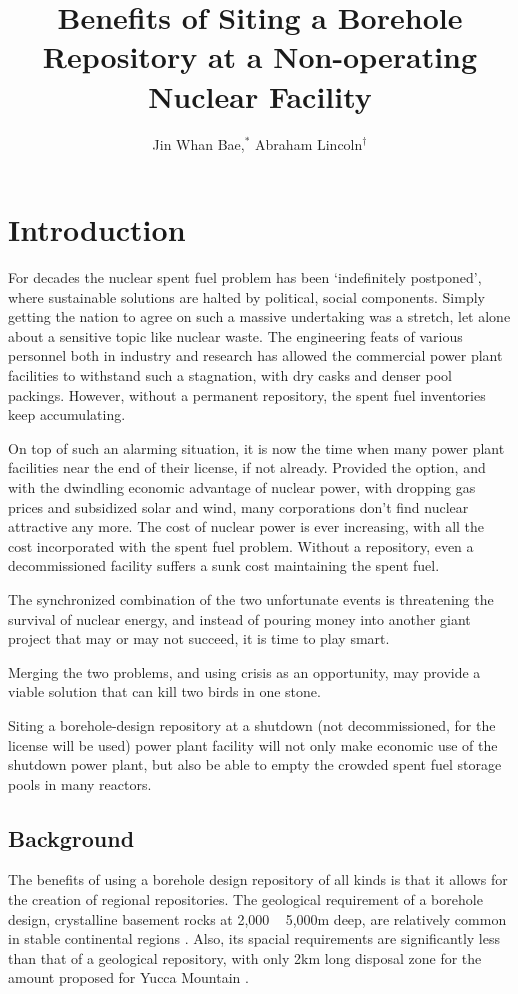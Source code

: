 \documentclass{anstrans}
\title{Benefits of Siting a Borehole Repository at a Non-operating Nuclear 
Facility}
\author{Jin Whan Bae,$^{*}$ Abraham Lincoln$^{\dagger}$}
\institute{
$^{*}$Dept. of Nuclear Plasma, and Radiological Engineering, University of Illinois at Urbana-Champaign, Urbana, IL
\and
$^{\dagger}$State Capitol Building, Springfield, IL
}
\begin{document}
\section{Introduction}

For decades the nuclear spent fuel problem has been `indefinitely postponed', 
where sustainable solutions are halted by political, social components. Simply 
getting the nation to agree on such a massive undertaking was a stretch, let 
alone about a sensitive topic like nuclear waste. The engineering feats of 
various personnel both in industry and research has allowed the commercial 
power plant facilities to withstand such a stagnation, with dry casks and 
denser pool packings. However, without a permanent repository, the spent fuel 
inventories keep accumulating.

On top of such an alarming situation, it is now the time when many power plant 
facilities near the end of their license, if not already. Provided the option, 
and with the dwindling economic advantage of nuclear power, with dropping gas 
prices and subsidized solar and wind, many corporations don't find nuclear 
attractive any more. The cost of nuclear power is ever increasing, with all the 
cost incorporated with the spent fuel problem. Without a repository, even a 
decommissioned facility suffers a sunk cost maintaining the spent fuel.

The synchronized combination of the two unfortunate events is threatening the 
survival of nuclear energy, and instead of pouring money into another giant 
project that may or may not succeed, it is time to play smart.

Merging the two problems, and using crisis as an opportunity, may provide a 
viable solution that can kill two birds in one stone.

Siting a borehole-design repository at a shutdown (not decommissioned, for the 
license will be used) power plant facility will not only make economic use of 
the shutdown power plant, but also be able to empty the crowded spent fuel 
storage pools in many reactors.


\subsection{Background}

The benefits of using a borehole design repository of all kinds is that it 
allows for the creation of regional repositories. The geological requirement of 
a borehole design, crystalline basement rocks at 2,000 ~ 5,000m deep, are 
relatively common in stable continental regions \cite{arnold_geological_2016}.  
Also, its spacial requirements are significantly less than that of a geological 
repository, with only 2km long disposal zone for the amount proposed for Yucca 
Mountain \cite{brady_deep_2009}.
\end{document}
